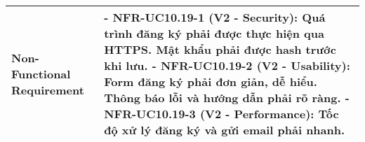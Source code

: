 \begin{longtable}{|m{4cm}|p{11cm}|}
\hline
Non-Functional Requirement & - \textbf{NFR-UC10.19-1 (V2 - Security):} Quá trình đăng ký phải được thực hiện qua HTTPS. Mật khẩu phải được hash trước khi lưu. \newline - \textbf{NFR-UC10.19-2 (V2 - Usability):} Form đăng ký phải đơn giản, dễ hiểu. Thông báo lỗi và hướng dẫn phải rõ ràng. \newline - \textbf{NFR-UC10.19-3 (V2 - Performance):} Tốc độ xử lý đăng ký và gửi email phải nhanh. \\
\hline
\end{longtable}